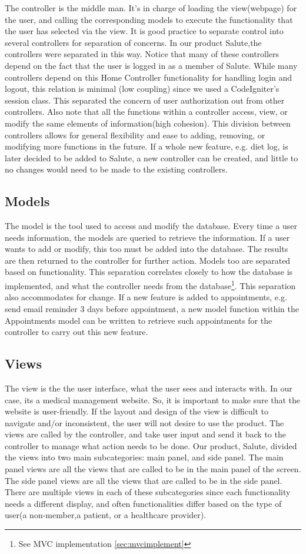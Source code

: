 The controller is the middle man. It's in charge of loading the view(webpage) for the user, and calling the corresponding models to execute the functionality that the user has selected via the view. 
It is good practice to separate control into several controllers for separation of concerns. In our product Salute,the controllers were separated in this way. Notice that many of these controllers depend on the fact that the user is logged in as a member of Salute. While many controllers depend on this Home Controller functionality for handling login and logout, this relation is minimal (low coupling) since we used a CodeIgniter's session class. This separated the concern of user authorization out from other controllers. 
Also note that all the functions within a controller access, view, or modify the same elements of information(high cohesion). This division between controllers allows for general flexibility and ease to adding, removing, or modifying more functions in the future. If a whole new feature, e.g. diet log, is later decided to be added to Salute, a new controller can be created, and little to no changes would need to be made to the existing controllers. 
\subsection{Models}
The model is the tool used to access and modify the database. Every time a user needs information, the models are queried to retrieve the information. If a user wants to add or modify, this too must be added into the database. The results are then returned to the controller for further action.
Models too are separated based on functionality. This separation correlates closely to how the database is implemented, and what the controller needs from the database\footnote{See MVC implementation \ref{sec:mvcimplement}}. This separation also accommodates for change. If a new feature is added to appointments, e.g. send email reminder 3 days before appointment, a new model function within the Appointments model can be written to retrieve such appointments for the controller to carry out this new feature. 

\subsection{Views}
The view is the the user interface, what the user sees and interacts with. In our case, its a medical management website. So, it is important to make sure that the website is user-friendly. If the layout and design of the view is difficult to navigate and/or inconsistent, the user will not desire to use the product. The views are called by the controller, and take user input and send it back to the controller to manage what action needs to be done. 
Our product, Salute, divided the views into two main subcategories: main panel, and side panel. The main panel views are all the views that are called to be in the main panel of the screen. The side panel views are all the views that are called to be in the side panel. There are multiple views in each of these subcategories since each functionality needs a different display, and often functionalities differ based on the type of user(a non-member,a patient, or a healthcare provider). 

